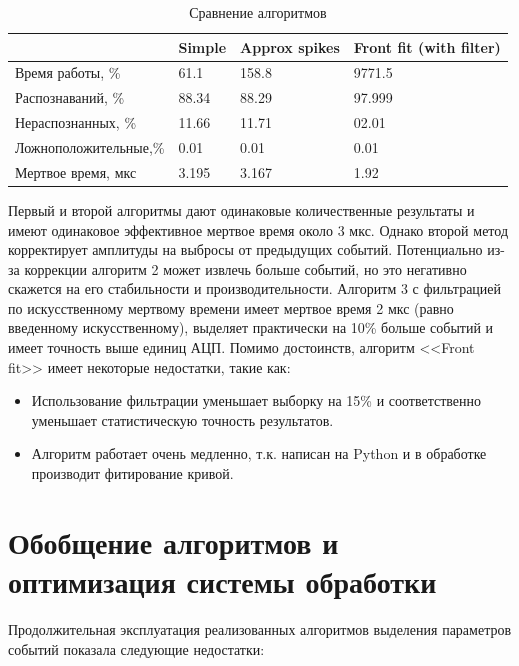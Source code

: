 \documentclass[a4paper,14pt]{extreport}
\begin{document}
\begin{table}
\centering
    \begin{tabular}{|l|l|l|l|}
        \hline
         & Simple & Approx spikes & Front fit (with filter) \\
        \hline
        Время работы, \% & 61.1 & 158.8 & 9771.5 \\
        \hline
        Распознаваний, \% & 88.34 & 88.29 & 97.999 \\
        \hline
        Нераспознанных,  \% & 11.66 & 11.71 & 02.01 \\
        \hline
        Ложноположительные,\% & 0.01 & 0.01 & 0.01 \\
        \hline
        Мертвое время, мкс & 3.195 & 3.167 & 1.92 \\ 
        \hline
    \end{tabular} 
    \caption{Сравнение алгоритмов}
    \label{tbl:methods-compare-1}
\end{table}

Первый и второй алгоритмы дают одинаковые количественные результаты и имеют одинаковое эффективное мертвое время около 3 мкс. Однако второй метод корректирует амплитуды на выбросы от предыдущих событий. Потенциально из-за коррекции алгоритм 2 может извлечь больше событий, но это негативно скажется на его стабильности и производительности. Алгоритм 3 с фильтрацией по искусственному мертвому времени имеет мертвое время 2 мкс (равно введенному искусственному), выделяет практически на 10\% больше событий и имеет точность выше единиц АЦП. Помимо достоинств, алгоритм <<Front fit>> имеет некоторые недостатки, такие как:

\begin{itemize}
    \item Использование фильтрации уменьшает выборку на 15\% и соответственно уменьшает статистическую точность результатов. 
    \item Алгоритм работает очень медленно, т.к. написан на Python и в обработке производит фитирование кривой.
\end{itemize}

\section{Обобщение алгоритмов и оптимизация системы обработки}

Продолжительная эксплуатация реализованных алгоритмов выделения параметров событий показала следующие недостатки:
\end{document}
